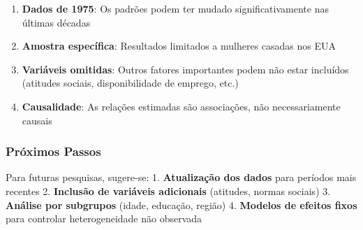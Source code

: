 \documentclass[
  letterpaper,
  DIV=11,
  numbers=noendperiod]{scrartcl}
\providecommand{\tightlist}{%
  \setlength{\itemsep}{0pt}\setlength{\parskip}{0pt}}\usepackage{longtable,booktabs,array}
\begin{document}
\begin{enumerate}
\def\labelenumi{\arabic{enumi}.}
\tightlist
\item
  \textbf{Dados de 1975}: Os padrões podem ter mudado significativamente
  nas últimas décadas
\item
  \textbf{Amostra específica}: Resultados limitados a mulheres casadas
  nos EUA
\item
  \textbf{Variáveis omitidas}: Outros fatores importantes podem não
  estar incluídos (atitudes sociais, disponibilidade de emprego, etc.)
\item
  \textbf{Causalidade}: As relações estimadas são associações, não
  necessariamente causais
\end{enumerate}

\subsubsection{Próximos Passos}\label{pruxf3ximos-passos}

Para futuras pesquisas, sugere-se: 1. \textbf{Atualização dos dados}
para períodos mais recentes 2. \textbf{Inclusão de variáveis adicionais}
(atitudes, normas sociais) 3. \textbf{Análise por subgrupos} (idade,
educação, região) 4. \textbf{Modelos de efeitos fixos} para controlar
heterogeneidade não observada
\end{document}
